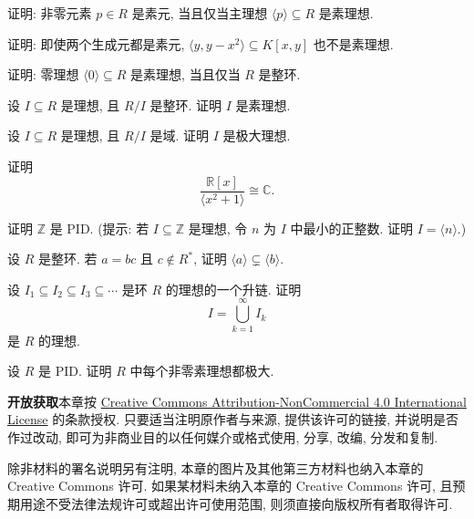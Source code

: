 \BookExerciseHeading
\begin{BookExercises}
  \item\label{ex:prime-element-and-principal-ideal} 证明: 非零元素 $p\in R$ 是素元, 当且仅当主理想 $\langle p\rangle\subseteq R$ 是素理想.
  \item\label{ex:two-prime-generators-not-prime} 证明: 即使两个生成元都是素元, $\langle y,y-x^{2}\rangle\subseteq K[x,y]$ 也不是素理想.
  \item\label{ex:zero-ideal-prime-iff-domain} 证明: 零理想 $\langle0\rangle\subseteq R$ 是素理想, 当且仅当 $R$ 是整环.
  \item\label{ex:domain-quotient-implies-prime} 设 $I\subseteq R$ 是理想, 且 $R/I$ 是整环. 证明 $I$ 是素理想.
  \item\label{ex:field-quotient-implies-maximal} 设 $I\subseteq R$ 是理想, 且 $R/I$ 是域. 证明 $I$ 是极大理想.
  \item\label{ex:real-quadratic-quotient-complex} 证明
    \[
      \frac{\mathbb{R}[x]}{\langle x^{2}+1\rangle}\cong\mathbb{C}.
    \]
  \item\label{ex:integers-pid} 证明 $\mathbb{Z}$ 是 PID. (提示: 若 $I\subseteq\mathbb{Z}$ 是理想, 令 $n$ 为 $I$ 中最小的正整数. 证明 $I=\langle n\rangle$.)
  \item\label{ex:factor-strict-principal-inclusion} 设 $R$ 是整环. 若 $a=bc$ 且 $c\notin R^{*}$, 证明 $\langle a\rangle\subsetneq\langle b\rangle$.
  \item\label{ex:ascending-ideal-union} 设 $I_{1}\subseteq I_{2}\subseteq I_{3}\subseteq\cdots$ 是环 $R$ 的理想的一个升链. 证明
    \[
      I=\bigcup_{k=1}^{\infty}I_{k}
    \]
    是 $R$ 的理想.
  \item\label{ex:nonzero-primes-maximal-in-pid} 设 $R$ 是 PID. 证明 $R$ 中每个非零素理想都极大.
\end{BookExercises}

\noindent\textbf{开放获取}\quad 本章按 \href{http://creativecommons.org/licenses/by-nc/4.0/}{Creative Commons Attribution-NonCommercial 4.0 International License} 的条款授权. 只要适当注明原作者与来源, 提供该许可的链接, 并说明是否作过改动, 即可为非商业目的以任何媒介或格式使用, 分享, 改编, 分发和复制.

除非材料的署名说明另有注明, 本章的图片及其他第三方材料也纳入本章的 Creative Commons 许可. 如果某材料未纳入本章的 Creative Commons 许可, 且预期用途不受法律法规许可或超出许可使用范围, 则须直接向版权所有者取得许可.
